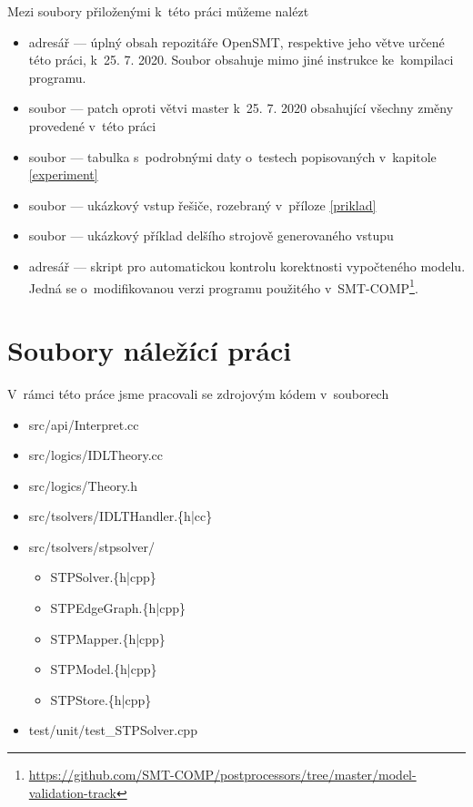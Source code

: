\documentclass[12pt,a4paper]{report}
\begin{document}
Mezi soubory přiloženými k~této práci můžeme nalézt
\begin{itemize}
	\item adresář  --- úplný obsah repozitáře OpenSMT, respektive jeho větve určené této práci, k~25. 7. 2020. Soubor  obsahuje mimo jiné instrukce ke~kompilaci programu.
	\item soubor  --- patch oproti větvi master k~25. 7. 2020 obsahující všechny změny provedené v~této práci
	\item soubor  --- tabulka s~podrobnými daty o~testech popisovaných v~kapitole \ref{experiment}
	\item soubor  --- ukázkový vstup řešiče, rozebraný v~příloze \ref{priklad}
	\item soubor  --- ukázkový příklad delšího strojově generovaného vstupu
	\item adresář  --- skript pro automatickou kontrolu korektnosti vypočteného modelu. Jedná se o~modifikovanou verzi programu použitého v~SMT-COMP\footnote{\url{https://github.com/SMT-COMP/postprocessors/tree/master/model-validation-track}}.
\end{itemize}

\section{Soubory náležící práci}
V~rámci této práce jsme pracovali se zdrojovým kódem v~souborech
\begin{itemize}
	\tt
	\item src/api/Interpret.cc\footnotemark
	\item src/logics/IDLTheory.cc\footnotemark[\value{footnote}]
	\item src/logics/Theory.h\footnotemark[\value{footnote}]
	\item src/tsolvers/IDLTHandler.\{h|cc\}\footnotemark[\value{footnote}]
	\item src/tsolvers/stpsolver/
	\begin{itemize}
		\item[] STPSolver.\{h|cpp\}\footnotemark[\value{footnote}]
		\item[] STPEdgeGraph.\{h|cpp\}
		\item[] STPMapper.\{h|cpp\}
		\item[] STPModel.\{h|cpp\}
		\item[] STPStore.\{h|cpp\}
	\end{itemize}
	\item test/unit/test\_STPSolver.cpp\footnotemark[\value{footnote}]
\end{itemize}
\end{document}
